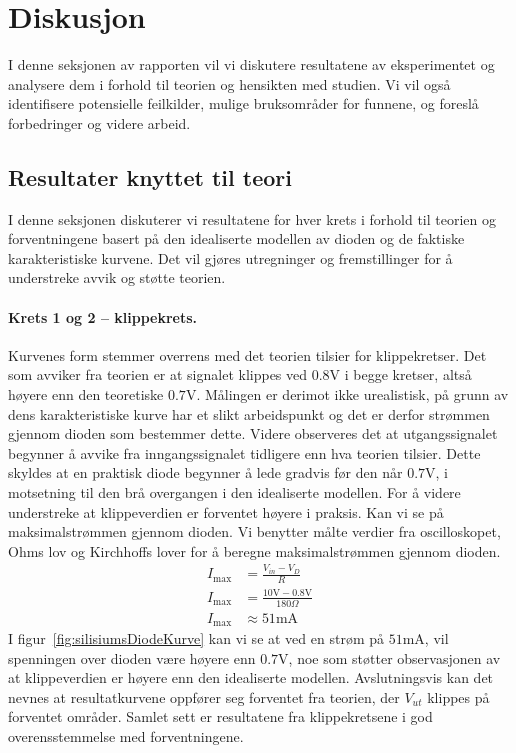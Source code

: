 \section{Diskusjon}
I denne seksjonen av rapporten vil vi diskutere resultatene av eksperimentet og analysere dem i forhold til teorien og hensikten med studien. Vi vil også identifisere potensielle feilkilder, mulige bruksområder for funnene, og foreslå forbedringer og videre arbeid.

\subsection{Resultater knyttet til teori}
I denne seksjonen diskuterer vi resultatene for hver krets i forhold til teorien og forventningene basert på den idealiserte modellen av dioden og de faktiske karakteristiske kurvene. Det vil gjøres utregninger og fremstillinger for å understreke avvik og støtte teorien.



\paragraph{Krets 1 og 2 -- klippekrets. } Kurvenes form stemmer overrens med det teorien tilsier for klippekretser. Det som avviker fra teorien er at signalet klippes ved  $0.8\text{V}$ i begge kretser, altså høyere enn den teoretiske $0.7\text{V}$. Målingen er derimot ikke urealistisk, på grunn av dens karakteristiske kurve har et slikt arbeidspunkt og det er derfor strømmen gjennom dioden som bestemmer dette. Videre observeres det at utgangssignalet begynner å avvike fra inngangssignalet tidligere enn hva teorien tilsier. Dette skyldes at en praktisk diode begynner å lede gradvis før den når $0.7\text{V}$, i motsetning til den brå overgangen i den idealiserte modellen. For å videre understreke at klippeverdien er forventet høyere i praksis. Kan vi se på maksimalstrømmen gjennom dioden. Vi benytter målte verdier fra oscilloskopet, Ohms lov og Kirchhoffs lover for å beregne maksimalstrømmen gjennom dioden.
\[
\begin{aligned}
    I_{\text{max}} &= \frac{V_{in} - V_D}{R} \\
    I_{\text{max}} &= \frac{10\text{V} - 0.8\text{V}}{180 \Omega} \\ 
    I_{\text{max}} &\approx 51\text{mA}
\end{aligned}
\]
\noindent
I figur~\ref{fig:silisiumsDiodeKurve} kan vi se at ved en strøm på $51\text{mA}$, vil spenningen over dioden være høyere enn $0.7\text{V}$, noe som støtter observasjonen av at klippeverdien er høyere enn den idealiserte modellen. Avslutningsvis kan det nevnes at resultatkurvene oppfører seg forventet fra teorien, der $V_{ut}$ klippes på forventet områder. Samlet sett er resultatene fra klippekretsene i god overensstemmelse med forventningene.


